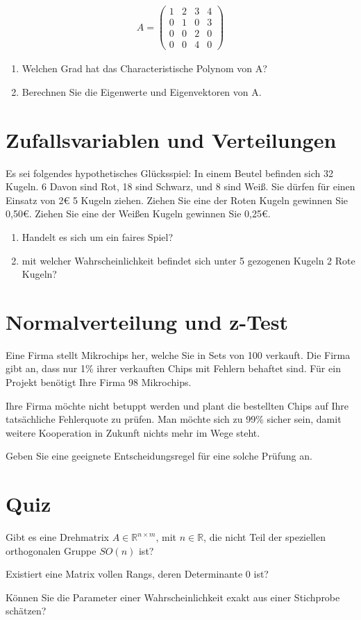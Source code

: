 \begin{align*}
    A = \begin{pmatrix}
            1 & 2 & 3 & 4 \\
            0 & 1 & 0 & 3 \\
            0 & 0 & 2 & 0 \\
            0 & 0 & 4 & 0
        \end{pmatrix}
\end{align*}

\begin{enumerate}
    \item Welchen Grad hat das Characteristische Polynom von A?
    \item Berechnen Sie die Eigenwerte und Eigenvektoren von A.
\end{enumerate}

\section{Zufallsvariablen und Verteilungen}

Es sei folgendes hypothetisches Glücksspiel: In einem Beutel befinden sich 32
Kugeln. 6 Davon sind Rot, 18 sind Schwarz, und 8 sind Weiß. Sie dürfen für
einen Einsatz von 2€ 5 Kugeln ziehen. Ziehen Sie eine der Roten Kugeln gewinnen
Sie 0,50€. Ziehen Sie eine der Weißen Kugeln gewinnen Sie 0,25€.

\begin{enumerate}
    \item Handelt es sich um ein faires Spiel?
    \item mit welcher Wahrscheinlichkeit befindet sich unter 5 gezogenen Kugeln 2 Rote
          Kugeln?
\end{enumerate}

\section{Normalverteilung und z-Test}

Eine Firma stellt Mikrochips her, welche Sie in Sets von 100 verkauft. Die
Firma gibt an, dass nur 1\% ihrer verkauften Chips mit Fehlern behaftet sind.
Für ein Projekt benötigt Ihre Firma 98 Mikrochips.

Ihre Firma möchte nicht betuppt werden und plant die bestellten Chips auf Ihre
tatsächliche Fehlerquote zu prüfen. Man möchte sich zu 99\% sicher sein, damit
weitere Kooperation in Zukunft nichts mehr im Wege steht.

Geben Sie eine geeignete Entscheidungsregel für eine solche Prüfung an.

\section{Quiz}

Gibt es eine Drehmatrix $A \in \mathbb{R}^{n \times m}$, mit $n \in
    \mathbb{R}$, die nicht Teil der speziellen orthogonalen Gruppe $SO(n)$ ist?

Existiert eine Matrix vollen Rangs, deren Determinante 0 ist?

Können Sie die Parameter einer Wahrscheinlichkeit exakt aus einer Stichprobe
schätzen?